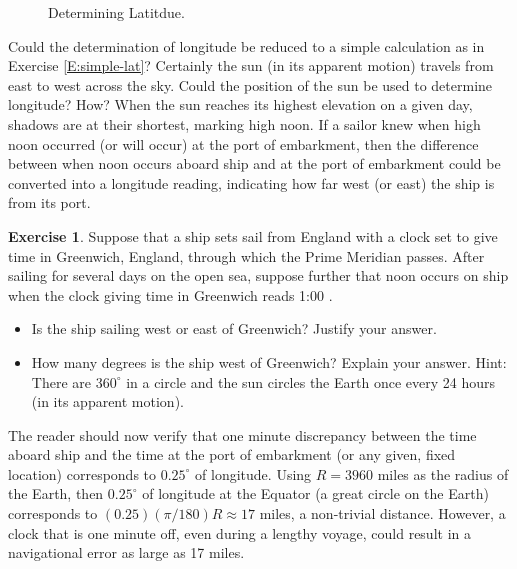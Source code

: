 \documentclass[12pt]{article}
\theoremstyle{definition}
\newtheorem{exercise}{Exercise}[section]
\begin{document}
\begin{figure}[htb] 
\begin{center}
\end{center}
\caption{Determining Latitdue.}  \label{F:pole}
\end{figure}



Could the determination of longitude be reduced to a simple
calculation as in Exercise \eqref{E:simple-lat}?  Certainly the sun
(in its apparent motion) travels from east to west across the sky.  
Could the position of the
sun be used to determine longitude?  How?  When the sun reaches its
highest elevation on a given day, shadows are at their shortest,
marking high noon.  If a sailor knew when high noon occurred (or will
occur) at the port of embarkment, then the difference between when
noon occurs aboard ship and at the port of embarkment could be
converted into a longitude reading, indicating how far west (or east)
the ship is from its port.  
\begin{exercise}  \label{E:simple-long}
Suppose that a ship sets sail from England with a clock set to give
time in Greenwich, England, through which the Prime Meridian passes.
After sailing for several days on the open sea, suppose further that noon
occurs on ship when the clock giving time in Greenwich reads 1:00
{}.
\begin{itemize}
\item[(a)]  Is the ship sailing west or east of Greenwich?  Justify
  your answer.
\item[(b)]  How many degrees is the ship west of Greenwich?  Explain
  your answer.  Hint:  There are $360^{\circ}$ in a circle and the sun
  circles the Earth once every 24 hours (in its apparent motion).
\end{itemize}
\end{exercise}

The reader should now verify that one minute discrepancy between the
time aboard ship and the time at the port of embarkment (or any given, fixed
location) corresponds to $0.25^{\circ}$ of longitude.  Using $R =
3960$ miles as the radius of the Earth, then  $0.25^{\circ}$ of
longitude at the Equator (a great circle on the Earth)
corresponds to $(0.25)(\pi /180)R \approx 17$ miles, a non-trivial
distance.  However, a clock that is one minute off, even
during a lengthy voyage, could result in a navigational error as large
as 17 miles.      
\end{document}
